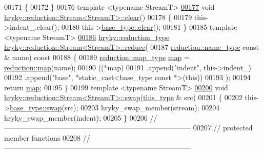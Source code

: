 \begin{DoxyCode}
00171 \{
00172 \}
00176 \textcolor{keyword}{template} <\textcolor{keyword}{typename} StreamT>
\hypertarget{reduction__stream_8h_source_l00177}{}\hyperlink{classhryky_1_1reduction_1_1_stream_a48136f4eabcf48e03b9dfe2cba793883}{00177} \textcolor{keywordtype}{void} \hyperlink{namespacehryky_aa201297ea9530da954a7230be71cc19d}{hryky::reduction::Stream<StreamT>::clear}()
00178 \{
00179     this->indent\_.clear();
00180     this->\hyperlink{namespacehryky_aa201297ea9530da954a7230be71cc19d}{base_type::clear}();
00181 \}
00185 \textcolor{keyword}{template} <\textcolor{keyword}{typename} StreamT>
\hypertarget{reduction__stream_8h_source_l00186}{}\hyperlink{classhryky_1_1reduction_1_1_stream_aa60cb1c7a7dc1fb1bc3ab6e57cfa8e34}{00186} \hyperlink{classhryky_1_1_intrusive_ptr}{hryky::reduction_type} \hyperlink{namespacehryky_1_1reduction_a064022926c530d18aeb1b2abdf71800b}{hryky::reduction::Stream<StreamT>::reduce}(
00187     \hyperlink{classhryky_1_1reduction_1_1_string}{reduction::name_type} \textcolor{keyword}{const} & name)\textcolor{keyword}{ const}
00188 \textcolor{keyword}{}\{
00189     \hyperlink{classhryky_1_1_intrusive_ptr}{reduction::map_type} \hyperlink{namespacehryky_1_1reduction_ac5eae270cf8047b294dc4ff3e5e11a79}{map} = \hyperlink{namespacehryky_1_1reduction_ac5eae270cf8047b294dc4ff3e5e11a79}{reduction::map}(name);
00190     ((*map)
00191      .append(\textcolor{stringliteral}{"indent"}, this->indent\_)
00192      .append(\textcolor{stringliteral}{"base"}, *static\_cast<base\_type const *>(\textcolor{keyword}{this}))
00193      );
00194     \textcolor{keywordflow}{return} \hyperlink{namespacehryky_1_1reduction_ac5eae270cf8047b294dc4ff3e5e11a79}{map};
00195 \}
00199 \textcolor{keyword}{template} <\textcolor{keyword}{typename} StreamT>
\hypertarget{reduction__stream_8h_source_l00200}{}\hyperlink{classhryky_1_1reduction_1_1_stream_a1149a619a2f584d1ae737010aefb54ca}{00200} \textcolor{keywordtype}{void} \hyperlink{namespacehryky_1_1reduction_a493c83efdf5f9e9c49ba77e1b65325a1}{hryky::reduction::Stream<StreamT>::swap}(\hyperlink{classhryky_1_1reduction_1_1_dispatcher}{this_type} & src)
00201 \{
00202     this->\hyperlink{namespacehryky_1_1reduction_a493c83efdf5f9e9c49ba77e1b65325a1}{base_type::swap}(src);
00203     hryky\_swap\_member(stream);
00204     hryky\_swap\_member(indent);
00205 \}
00206 \textcolor{comment}{//
      ------------------------------------------------------------------------------}
00207 \textcolor{comment}{// protected member functions}
00208 \textcolor{comment}{//
      ------------------------------------------------------------------------------}

\end{DoxyCode}
